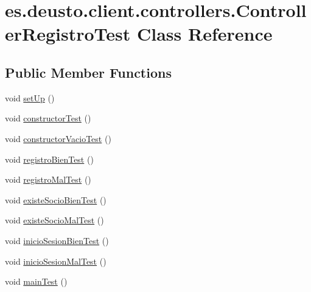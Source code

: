 \hypertarget{classes_1_1deusto_1_1client_1_1controllers_1_1_controller_registro_test}{}\section{es.\+deusto.\+client.\+controllers.\+Controller\+Registro\+Test Class Reference}
\label{classes_1_1deusto_1_1client_1_1controllers_1_1_controller_registro_test}
\subsection*{Public Member Functions}
\begin{DoxyCompactItemize}
\item 
void \mbox{\hyperlink{classes_1_1deusto_1_1client_1_1controllers_1_1_controller_registro_test_ac5cd8c8fa69d92f474168a782f5fcbaf}{set\+Up}} ()
\item 
void \mbox{\hyperlink{classes_1_1deusto_1_1client_1_1controllers_1_1_controller_registro_test_a6fa7b0eb0d46b103ab8f07d988646647}{constructor\+Test}} ()
\item 
void \mbox{\hyperlink{classes_1_1deusto_1_1client_1_1controllers_1_1_controller_registro_test_ae970814f6486f25b28834b3654d2e219}{constructor\+Vacio\+Test}} ()
\item 
void \mbox{\hyperlink{classes_1_1deusto_1_1client_1_1controllers_1_1_controller_registro_test_aee06a6c8e8e3588fc27e048351761397}{registro\+Bien\+Test}} ()
\item 
void \mbox{\hyperlink{classes_1_1deusto_1_1client_1_1controllers_1_1_controller_registro_test_ae8171ee6eae5df44924c7e4fdba6fc82}{registro\+Mal\+Test}} ()
\item 
void \mbox{\hyperlink{classes_1_1deusto_1_1client_1_1controllers_1_1_controller_registro_test_aae6baa063afb9c10e98e3298f1a8fa70}{existe\+Socio\+Bien\+Test}} ()
\item 
void \mbox{\hyperlink{classes_1_1deusto_1_1client_1_1controllers_1_1_controller_registro_test_a630fe9bed36c8cc730cbbb619ebd57d0}{existe\+Socio\+Mal\+Test}} ()
\item 
void \mbox{\hyperlink{classes_1_1deusto_1_1client_1_1controllers_1_1_controller_registro_test_ac635a6395d3a69a450a05d0b92760032}{inicio\+Sesion\+Bien\+Test}} ()
\item 
void \mbox{\hyperlink{classes_1_1deusto_1_1client_1_1controllers_1_1_controller_registro_test_aa71b60813386a10e64c7ee443e70d87a}{inicio\+Sesion\+Mal\+Test}} ()
\item 
void \mbox{\hyperlink{classes_1_1deusto_1_1client_1_1controllers_1_1_controller_registro_test_ab03f92c55d791916c98cab2cfed49601}{main\+Test}} ()
\end{DoxyCompactItemize}


